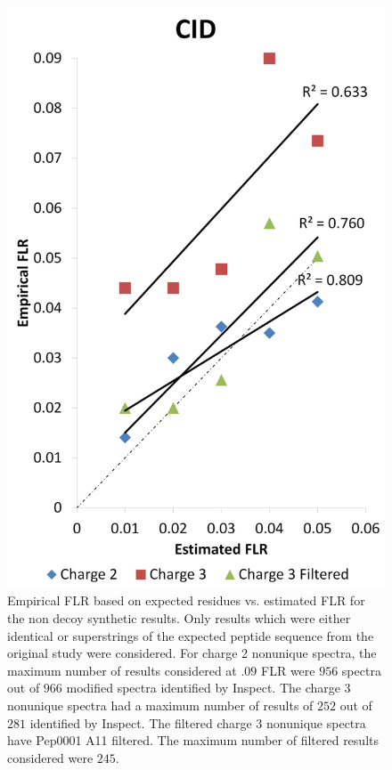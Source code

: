 \documentclass[11pt]{article}
\begin{document}
{\begin{figure}[h]
\centering
\includegraphics[scale=.5]{fig/synthetic/all_charge_cid_empirical_vs_estimated_flr.png}
\caption{Empirical FLR based on expected residues vs. estimated FLR for the non decoy synthetic results. Only results which were either identical or superstrings of the expected peptide sequence from the original study were considered.  For charge 2 nonunique spectra, the maximum number of results considered at $.09$ FLR were $956$ spectra out of $966$ modified spectra identified by Inspect. The charge 3 nonunique spectra had a maximum number of results of $252$ out of $281$ identified by Inspect. The filtered charge 3 nonunique spectra have Pep0001 A11 filtered. The maximum number of filtered results considered were $245$. }
\label{fig:syntheticEmpiricalvsEstimated}
\end{figure}

}
\end{document}
